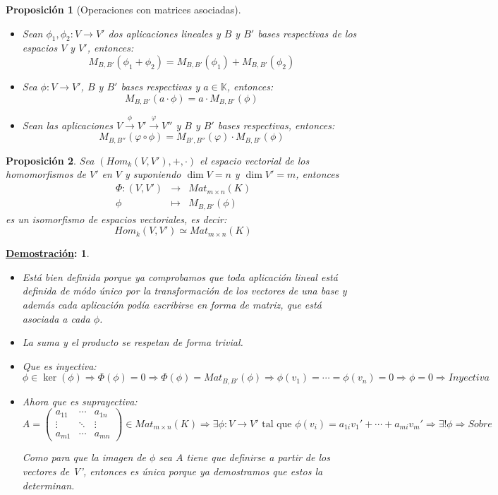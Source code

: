 \documentclass[10pt,a4paper,openright]{book}
\theoremstyle{break}
\newtheorem*{prop}{Proposición}
\newtheorem*{demo}{\underline{Demostración}:}
\begin{document}
\begin{prop}[Operaciones con matrices asociadas]
\begin{itemize}
\item Sean $\phi_1,\phi_2 : V\longrightarrow V'$ dos aplicaciones lineales y $B$ y $B'$ bases respectivas de los espacios $V$ y $V'$, entonces:
$$
M_{B,B'}(\phi_1+\phi_2)=M_{B,B'}(\phi_1)+M_{B,B'}(\phi_2)
$$

\item Sea $\phi : V\longrightarrow V'$, $B$ y $B'$ bases respectivas y $a\in \mathbb K$, entonces:
$$
M_{B,B'}(a\cdot \phi)=a \cdot M_{B,B'}(\phi)
$$

\item Sean las aplicaciones $V\stackrel{\phi}{\longrightarrow} V'\stackrel{\varphi}{\longrightarrow } V''$ y $B$ y $B'$ bases respectivas, entonces:
$$
M_{B,B''}(\varphi\circ \phi)=M_{B',B''}(\varphi)\cdot M_{B,B'}(\phi)
$$
\end{itemize}
\end{prop}

\begin{prop}
Sea $(Hom_k(V,V'), +, \cdot )$ el espacio vectorial de los homomorfismos de $V'$ en $V$ y suponiendo $\dim V=n$ y $\dim V'=m$, entonces
\begin{eqnarray*} \Phi:(V,V') &\longrightarrow& Mat_{m\times n}(K)\\ \phi &\longmapsto& M_{B,B'}(\phi) 
\end{eqnarray*} 
es un isomorfismo de espacios vectoriales, es decir:
$$
Hom_k(V,V')\simeq Mat_{m\times n}(K)
$$
\end{prop}
\begin{demo}
\begin{itemize}
\item Está bien definida porque ya comprobamos que toda aplicación lineal está definida de módo único por la transformación de los vectores de una base y además cada aplicación podía escribirse en forma de matriz, que está asociada a cada $\phi$.

\item La suma y el producto se respetan de forma trivial.

\item Que es inyectiva:
$$\phi\in \ker(\phi)\Rightarrow \Phi(\phi)=0\Rightarrow \Phi(\phi)=Mat_{B,B'}(\phi)\Rightarrow \phi(v_1)=\cdots=\phi(v_n)=0\Rightarrow \phi=0\Rightarrow Inyectiva$$

\item Ahora que es suprayectiva:
$$A=\begin{pmatrix}
a_{11} & \cdots & a_{1n} \\ \vdots & \ddots & \vdots \\ a_{m1} & \cdots & a_{mn}\end{pmatrix}\in Mat_{m\times n}(K)\Rightarrow \exists \phi: V\rightarrow V'\mbox{ tal que }\phi(v_i)=a_{1i}v_1'+\cdots+a_{mi}v_m'\Rightarrow \exists!\phi\Rightarrow Sobre$$

Como para que la imagen de $\phi$ sea $A$ tiene que definirse a partir de los vectores de V', entonces es única porque ya demostramos que estos la determinan.
\end{itemize}
\end{demo}
\end{document}
